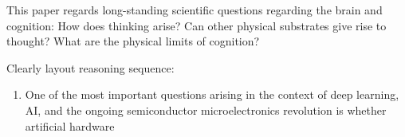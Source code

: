 \vspace{3em}
This paper regards long-standing scientific questions regarding the brain and cognition: How does thinking arise? Can other physical substrates give rise to thought? What are the physical limits of cognition?

\vspace{3em}
\cite{sisc2017}

\vspace{3em}
Clearly layout reasoning sequence:
\begin{enumerate}
\item One of the most important questions arising in the context of deep learning, AI, and the ongoing semiconductor microelectronics revolution is whether artificial hardware
\end{enumerate}